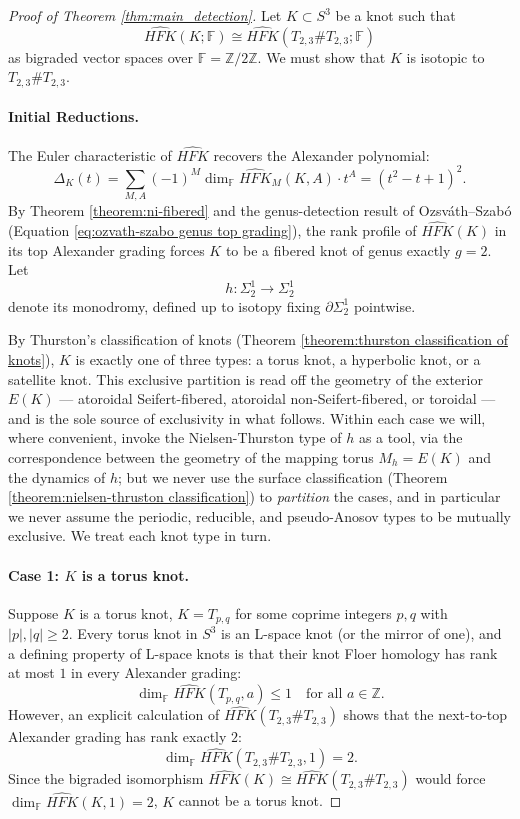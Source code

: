 \begin{proof}[Proof of Theorem \ref{thm:main_detection}]
Let $K \subset S^3$ be a knot such that
\[
\widehat{HFK}(K; \mathbb{F}) \cong \widehat{HFK}(T_{2,3} \# T_{2,3}; \mathbb{F})
\]
as bigraded vector spaces over $\mathbb{F} = \mathbb{Z}/2\mathbb{Z}$. We must show that $K$ is isotopic to $T_{2,3} \# T_{2,3}$.

\paragraph{Initial Reductions.}
The Euler characteristic of $\widehat{HFK}$ recovers the Alexander polynomial:
\[
\Delta_K(t) = \sum_{M,A} (-1)^M \dim_{\mathbb{F}} \widehat{HFK}_M(K, A) \cdot t^A = (t^2 - t + 1)^2.
\]
By Theorem \ref{theorem:ni-fibered} and the genus-detection result of Ozsv\'{a}th--Szab\'{o} (Equation \eqref{eq:ozvath-szabo genus top grading}), the rank profile of $\widehat{HFK}(K)$ in its top Alexander grading forces $K$ to be a fibered knot of genus exactly $g = 2$. Let
\[
h \colon \Sigma_2^1 \to \Sigma_2^1
\]
denote its monodromy, defined up to isotopy fixing $\partial \Sigma_2^1$ pointwise.

By Thurston's classification of knots (Theorem \ref{theorem:thurston classification of knots}), $K$ is exactly one of three types: a torus knot, a hyperbolic knot, or a satellite knot. This exclusive partition is read off the geometry of the exterior $E(K)$ --- atoroidal Seifert-fibered, atoroidal non-Seifert-fibered, or toroidal --- and is the sole source of exclusivity in what follows. Within each case we will, where convenient, invoke the Nielsen-Thurston type of $h$ as a tool, via the correspondence between the geometry of the mapping torus $M_h = E(K)$ and the dynamics of $h$; but we never use the surface classification (Theorem \ref{theorem:nielsen-thruston classification}) to \emph{partition} the cases, and in particular we never assume the periodic, reducible, and pseudo-Anosov types to be mutually exclusive. We treat each knot type in turn.

\paragraph{Case 1: $K$ is a torus knot.}
Suppose $K$ is a torus knot, $K = T_{p,q}$ for some coprime integers $p, q$ with $|p|, |q| \ge 2$. Every torus knot in $S^3$ is an L-space knot (or the mirror of one), and a defining property of L-space knots is that their knot Floer homology has rank at most $1$ in every Alexander grading:
\[
\dim_{\mathbb{F}} \widehat{HFK}(T_{p,q}, a) \le 1 \quad \text{for all } a \in \mathbb{Z}.
\]
However, an explicit calculation of $\widehat{HFK}(T_{2,3}\# T_{2,3})$ shows that the next-to-top Alexander grading has rank exactly $2$:
\[
\dim_{\mathbb{F}} \widehat{HFK}(T_{2,3}\# T_{2,3}, 1) = 2.
\]
Since the bigraded isomorphism $\widehat{HFK}(K) \cong \widehat{HFK}(T_{2,3}\# T_{2,3})$ would force $\dim_{\mathbb{F}} \widehat{HFK}(K, 1) = 2$, $K$ cannot be a torus knot.


\end{proof}
